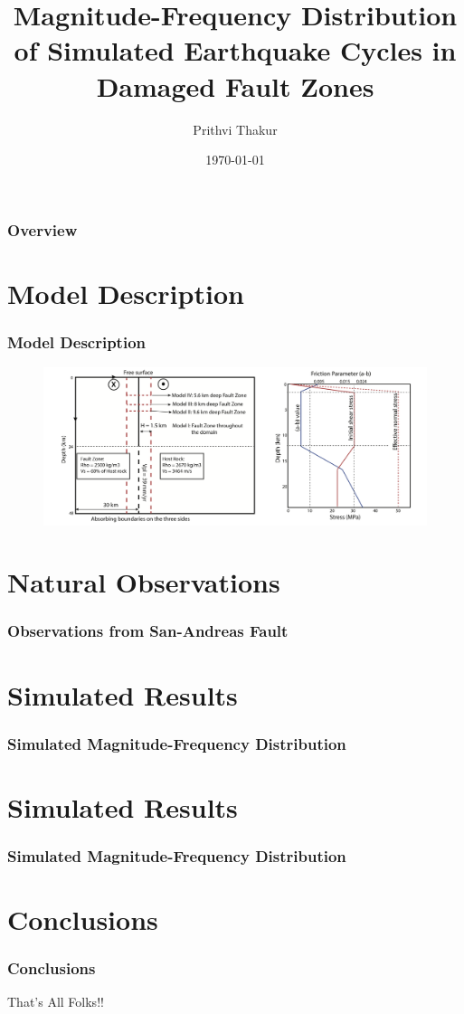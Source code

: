 \documentclass{beamer}
\title[MFD in EQ Cycles]{Magnitude-Frequency Distribution of Simulated Earthquake Cycles in Damaged Fault Zones}
\author{Prithvi Thakur}
\institute[UofM]
{
University of Michigan \\ %
\medskip
\textit{prith@umich.edu} %
}
\date{\today} %
\begin{document}
\begin{frame}
    \titlepage 
\end{frame}

\begin{frame}
    \frametitle{Overview}
    \tabeleofcontents
\end{frame}

\section{Model Description}
\begin{frame}
    \frametitle{Model Description}
    \begin{figure}
        \includegraphics[width=0.9\linewidth]{images/model_setup}
    \end{figure}
\end{frame}

\section{Natural Observations}
\begin{frame}
    \frametitle{Observations from San-Andreas Fault}
\end{frame}

\section{Simulated Results}
\begin{frame}
    \frametitle{Simulated Magnitude-Frequency Distribution}
\end{frame}

\section{Simulated Results}
\begin{frame}
    \frametitle{Simulated Magnitude-Frequency Distribution}
\end{frame}

\section{Conclusions}
\begin{frame}
    \frametitle{Conclusions}
\end{frame}

\begin{frame}
    \Huge{\centerline{That's All Folks!!}}
\end{frame}
\end{document}
